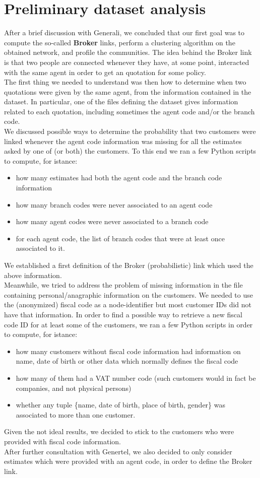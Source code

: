\documentclass[a4paper,11pt]{book}
\begin{document}
\section{Preliminary dataset analysis}
After a brief discussion with Generali, we concluded that our first goal was to compute the so-called \textbf{Broker} links, perform a clustering algorithm on the obtained network, and profile the communities. The idea behind the Broker link is that two people are connected whenever they have, at some point, interacted with the same agent in order to get an quotation for some policy.\\
The first thing we needed to understand was then how to determine when two quotations were given by the same agent, from the information contained in the dataset. In particular, one of the files defining the dataset gives information related to each quotation, including sometimes the agent code and/or the branch code.\\
We discussed possible ways to determine the probability that two customers were linked whenever the agent code information was missing for all the estimates asked by one of (or both) the customers. To this end we ran a few Python scripts to compute, for istance:
\begin{itemize}
\item how many estimates had both the agent code and the branch code information
\item how many branch codes were never associated to an agent code
\item how many agent codes were never associated to a branch code
\item for each agent code, the list of branch codes that were at least once associated to it.
\end{itemize}
We established a first definition of the Broker (probabilistic) link which used the above information.\\

Meanwhile, we tried to address the problem of missing information in the file containing personal/anagraphic information on the customers. We needed to use the (anonymized) fiscal code as a node-identifier but most customer IDs did not have that information. In order to find a possible way to retrieve a new fiscal code ID for at least some of the customers, we ran a few Python scripts in order to compute, for istance:
\begin{itemize}
\item how many customers without fiscal code information had information on name, date of birth or other data which normally defines the fiscal code
\item how many of them had a VAT number code (such customers would in fact be companies, and not physical persons)
\item whether any tuple \{name, date of birth, place of birth, gender\} was associated to more than one customer.
\end{itemize}
Given the not ideal results, we decided to stick to the customers who were provided with fiscal code information.\\
After further consultation with Genertel, we also decided to only consider estimates which were provided with an agent code, in order to define the Broker link.
\end{document}
